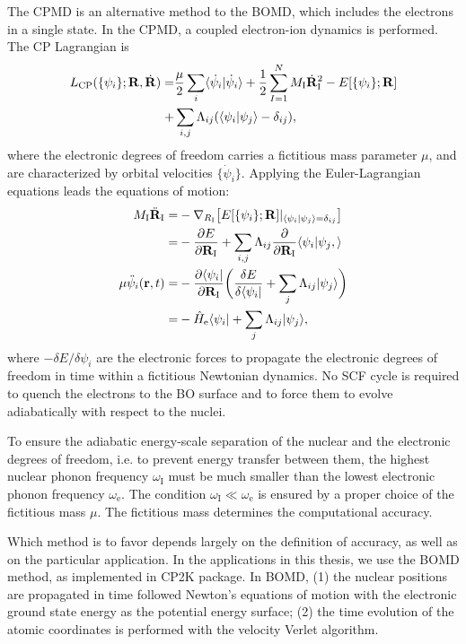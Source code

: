 The CPMD is an alternative method to the BOMD, which includes the 
electrons in a single state\cite{CP1985}. In the CPMD, a coupled electron-ion dynamics is performed.
The CP Lagrangian is 
\begin{align}
L_{\text{CP}} (\{\psi_i\}; {\bf R},\dot{{\bf R}}) =& \frac{\mu}{2}\sum_i\langle\dot{\psi}_i|\dot{\psi}_i\rangle +  \frac{1}{2}\sum^N_{I=1}M_{\text{I}}\dot{\bf R}^2_{\text{I}}  - E[\{\psi_i\};{\bf R}] \nonumber \\
   +& \sum_{i,j}\Lambda_{ij}(\langle\psi_i|\psi_j\rangle -\delta_{ij} ),
\label{eq:L_CP}
\end{align}
where the electronic degrees of freedom carries a fictitious mass parameter $\mu$, and are characterized by orbital velocities 
$\{\dot{\psi}_i\}$.  Applying the Euler-Lagrangian equations leads the equations of motion:
\begin{align}
  M_{\text{I}}\ddot{\bf R}_{\text{I}} =& -\nabla_{R_{\text{I}}} \bigl[E[\{\psi_i\};{\bf R}]|_{\langle\psi_i|\psi_j\rangle=\delta_{ij} }\bigr]\nonumber \\
  =&-\frac{\partial E}{\partial {\bf R}_{\text{I}}}  + \sum_{i,j}\Lambda_{ij}\frac{\partial}{\partial {\bf R}_{\text{I}}}\langle\psi_i|\psi_j, \rangle\\ 
  \mu\ddot{\psi}_i({\bf r},t) =& -\frac{\partial \langle\psi_i|}{\partial {\bf R}_{\text{I}}}\biggl(\frac{\delta E}{\delta\langle\psi_i|} + \sum_j \Lambda_{ij}|\psi_j\rangle\biggr)\nonumber \\
  =& -\hat{H}_{\text{e}}\langle\psi_i| + \sum_j \Lambda_{ij}|\psi_j\rangle,
\label{eq:LEE_CP}
\end{align}
where $-\delta E/\delta\psi_i$ are the electronic forces to propagate the electronic degrees of freedom in time 
within a fictitious Newtonian dynamics.  No SCF cycle is required to quench the electrons to the BO surface and 
to force them to evolve adiabatically with respect to the nuclei.

To ensure the adiabatic energy-scale separation of the nuclear and the electronic degrees of freedom, i.e. 
to prevent energy transfer between them, the highest nuclear phonon frequency  $\omega_{\text{I}}$ must be 
much smaller than the lowest electronic phonon frequency $\omega_{\text{e}}$. The condition $\omega_{\text{I}} \ll \omega_{\text{e}}$ 
is ensured by a proper choice of the fictitious mass $\mu$. The fictitious mass determines the computational accuracy.  

Which method is to favor depends largely on the definition of accuracy, as well as on the particular application.
In the applications in this thesis, we use the BOMD method, as implemented in CP2K package\cite{CP2K,Kuehne2020}. 
In BOMD,  
(1) the nuclear positions are propagated in time followed Newton's equations of motion with the electronic ground state energy as the potential energy surface; 
(2) the time evolution of the atomic coordinates is performed with the velocity Verlet algorithm\cite{FS2002}.

